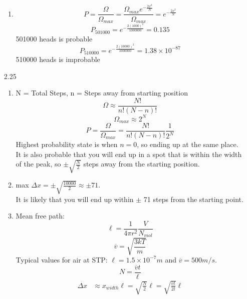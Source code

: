 \documentclass{article}
\begin{document}
\begin{enumerate}
\begin{enumerate}
            \item
            \begin{equation*}
                P = \frac{\Omega}{\Omega_{max}} = \frac{\Omega_{max} e^{-\frac{2x^2}{N}}}{\Omega_{max}} = e^{-\frac{2x^2}{N}}
            \end{equation*}
            \begin{equation*}
                P_{501000} = e^{-\frac{2(1000)^2}{1000000}} = 0.135
            \end{equation*}
            501000 heads is probable
            \begin{equation*}
                P_{510000} = e^{-\frac{2(10000)^2}{1000000}} = 1.38 \times 10^{-87}
            \end{equation*}
            510000 heads is improbable
        \end{enumerate}
    \vspace{0.1in}
    \item [2.25]
        \begin{enumerate}
            \item
                N = Total Steps, n = Steps away from starting position
                \[\Omega \approx \frac{N!}{n!(N - n)!}\]
                \[\Omega_{max} \approx 2^N\]
                \[P = \frac{\Omega}{\Omega_{max}} = \frac{N!}{n!(N-n)!} \frac{1}{2^N}\]
                Highest probability state is when \(n = 0\), so ending up at the same place.
                It is also probable that you will end up in a spot that is within the width of the peak, so \(\pm \sqrt{\frac{N}{2}}\) steps away from the starting position.
            \item
                max \(\Delta x = \pm \sqrt{\frac{10000}{2}} \approx \pm 71\). \\
                It is likely that you will end up within \(\pm\) 71 steps from the starting point.
            \item
                Mean free path:
                \[\ell = \frac{1}{4 \pi r^2} \frac{V}{N_{mol}}\]
                \[\overline{v} = \sqrt{\frac{3kT}{m}}\]
                Typical values for air at STP: \(\ell = 1.5 \times 10^{-7}m\) and \(\overline{v} = 500 m/s\).
                \[N = \frac{\overline{v} t}{\ell}\]
                \begin{align*}
                    \Delta x &\approx x_{width} \ell = \sqrt{\frac{N}{2}} \ell = \sqrt{\frac{\overline{v} t}{2 l}} \ell \\

\end{align*}
\end{enumerate}
\end{enumerate}
\end{document}
